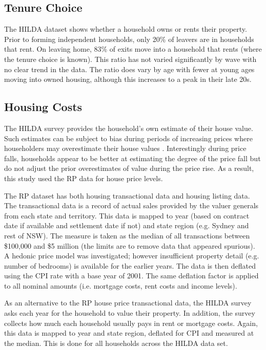 \documentclass[12pt]{article}
\begin{document}
\subsection{Tenure Choice}
The HILDA dataset shows whether a household owns or rents their property. Prior to forming independent households, only 20\% of leavers are in households that rent.  On leaving home, 83\% of exits move into a household that rents (where the tenure choice is known). This ratio has not varied significantly by wave with no clear trend in the data. The ratio does vary by age with fewer at young ages moving into owned housing, although this increases to a peak in their late 20s.

\subsection{Housing Costs}
The HILDA survey provides the household's own estimate of their house value. Such estimates can be subject to bias during periods of increasing prices where householders may overestimate their house values \parencite{henriques2013perceptions}. Interestingly during price falls, households appear to be better at estimating the degree of the price fall but do not adjust the prior overestimates of value during the price rise. As a result, this study used the RP data for house price levels.

The RP dataset has both housing transactional data and housing listing data. The transactional data is a record of actual sales provided by the valuer generals from each state and territory. This data is mapped to year (based on contract date if available and settlement date if not) and state region (e.g. Sydney and rest of NSW). The measure is taken as the median of all transactions between \$100,000 and \$5 million (the limits are to remove data that appeared spurious). A hedonic price model was investigated; however insufficient property detail (e.g. number of bedrooms) is available for the earlier years. The data is then deflated using the CPI rate with a base year of 2001. The same deflation factor is applied to all nominal amounts (i.e. mortgage costs, rent costs and income levels).

As an alternative to the RP house price transactional data, the HILDA survey asks each year for the household to value their property. In addition, the survey collects how much each household usually pays in rent or mortgage costs. Again, this data is mapped to year and state region, deflated for CPI and measured at the median. This is done for all households across the HILDA data set.
\end{document}
